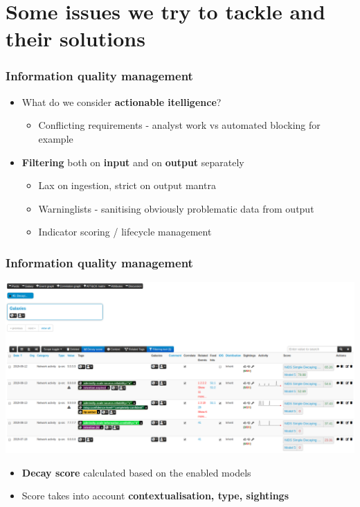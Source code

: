 \section{Some issues we try to tackle and their solutions}

\begin{frame}
\frametitle{Information quality management}
    \begin{itemize}
        \item What do we consider {\bf actionable itelligence}?
        \begin{itemize}
            \item Conflicting requirements - analyst work vs automated blocking for example
        \end{itemize}
        \item {\bf Filtering} both on {\bf input} and on {\bf output} separately
        \begin{itemize}
            \item Lax on ingestion, strict on output mantra
            \item Warninglists - sanitising obviously problematic data from output
            \item Indicator scoring / lifecycle management
        \end{itemize}
    \end{itemize}
\end{frame}

\begin{frame}
    \frametitle{Information quality management}
    \includegraphics[width=1.00\linewidth]{decaying-event.png}
    \begin{itemize}
        \item {\bf Decay score} calculated based on the enabled models
        \item Score takes into account {\bf contextualisation, type, sightings}
    \end{itemize}
\end{frame}

